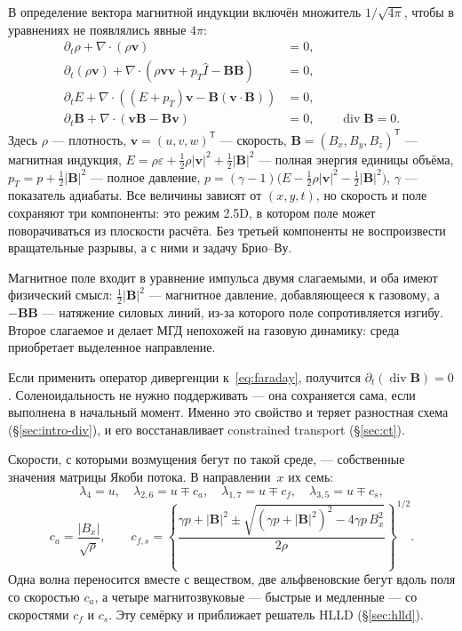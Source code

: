 \documentclass[12pt,a4paper]{article}
\newcommand{\divg}{\operatorname{div}}
\newcommand{\B}{\mathbf{B}}
\newcommand{\vv}{\mathbf{v}}
\begin{document}
В определение вектора магнитной индукции включён множитель $1/\sqrt{4\pi}$,
чтобы в уравнениях не появлялись явные $4\pi$:
\begin{align}
 \partial_t\rho + \nabla\cdot(\rho\vv) &= 0, \label{eq:mass}\\
 \partial_t(\rho\vv)+\nabla\cdot\!\left(\rho\vv\vv + p_T\hat I - \B\B\right) &= 0,
   \label{eq:mom}\\
 \partial_t E+\nabla\cdot\!\left((E+p_T)\vv - \B(\vv\cdot\B)\right) &= 0,
   \label{eq:ene}\\
 \partial_t\B + \nabla\cdot(\vv\B - \B\vv) &= 0, \qquad \divg\B = 0.
   \label{eq:faraday}
\end{align}
Здесь $\rho$ --- плотность, $\vv=(u,v,w)^{\mathsf T}$ --- скорость,
$\B=(B_x,B_y,B_z)^{\mathsf T}$ --- магнитная индукция,
$E=\rho\varepsilon+\tfrac12\rho|\vv|^2+\tfrac12|\B|^2$ --- полная энергия
единицы объёма, $p_T=p+\tfrac12|\B|^2$ --- полное давление,
$p=(\gamma-1)\bigl(E-\tfrac12\rho|\vv|^2-\tfrac12|\B|^2\bigr)$,
$\gamma$ --- показатель адиабаты. Все величины зависят от $(x,y,t)$, но скорость
и поле сохраняют три компоненты: это режим 2.5D, в котором поле может
поворачиваться из плоскости расчёта. Без третьей компоненты не воспроизвести
вращательные разрывы, а с ними и задачу Брио--Ву.

Магнитное поле входит в уравнение импульса двумя слагаемыми, и оба имеют
физический смысл: $\tfrac12|\B|^2$ — магнитное давление, добавляющееся к
газовому, а $-\B\B$ — натяжение силовых линий, из-за которого поле сопротивляется
изгибу. Второе слагаемое и делает МГД непохожей на газовую динамику: среда
приобретает выделенное направление.

Если применить оператор дивергенции к~\eqref{eq:faraday}, получится
$\partial_t(\divg\B)=0$. Соленоидальность не нужно поддерживать — она сохраняется
сама, если выполнена в начальный момент. Именно это свойство и теряет разностная
схема (\S\ref{sec:intro-div}), и его восстанавливает constrained transport
(\S\ref{sec:ct}).

Скорости, с которыми возмущения бегут по такой среде, — собственные значения
матрицы Якоби потока. В направлении~$x$ их семь:
\[
 \lambda_{4}=u,\quad
 \lambda_{2,6}=u\mp c_a,\quad
 \lambda_{1,7}=u\mp c_f,\quad
 \lambda_{3,5}=u\mp c_s,
\]
\[
 c_a=\frac{|B_x|}{\sqrt\rho},\qquad
 c_{f,s}=\left\{
 \frac{\gamma p+|\B|^2\pm\sqrt{(\gamma p+|\B|^2)^2-4\gamma p\,B_x^2}}{2\rho}
 \right\}^{1/2}.
\]
Одна волна переносится вместе с веществом, две альфвеновские бегут вдоль поля со
скоростью $c_a$, а четыре магнитозвуковые — быстрые и медленные — со скоростями
$c_f$ и $c_s$. Эту семёрку и приближает решатель HLLD (\S\ref{sec:hlld}).
\end{document}
